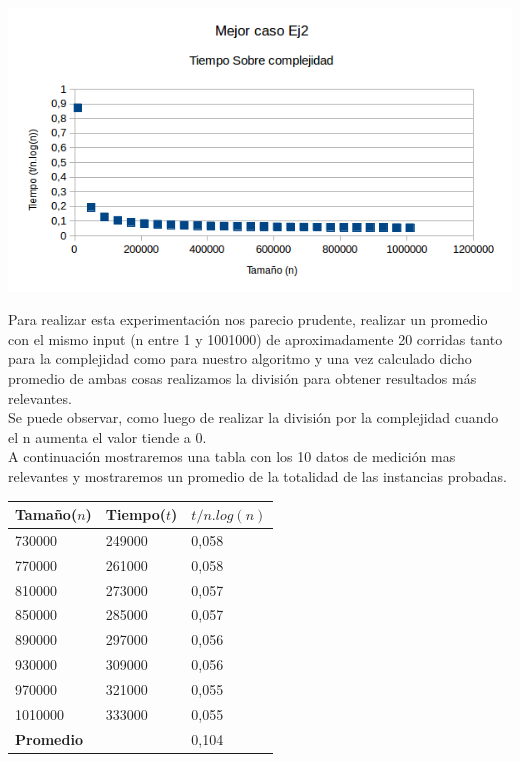 \vspace*{0.3cm} \vspace*{0.3cm}
  \begin{center}
 \includegraphics[scale=0.8]{./EJ2/grafico2ejmejorcaso1.png}
  \end{center}
  \vspace*{0.3cm}

Para realizar esta experimentaci\'on nos parecio prudente, realizar un promedio con el mismo input (n entre 1 y 1001000) de aproximadamente 20 corridas
tanto para la complejidad como para nuestro algoritmo y una vez calculado dicho promedio de ambas cosas realizamos la divisi\'on para
obtener resultados m\'as relevantes.\\ 

Se puede observar, como luego de realizar la divisi\'on por la complejidad cuando el n aumenta el valor tiende a 0.\\

A continuaci\'on mostraremos una tabla  con los 10 datos de medici\'on mas relevantes  y mostraremos un promedio de la totalidad de las instancias probadas.\\

\begin{table}[H]

    \begin{tabular}{ | l | l |l |}
    \hline
	Tamaño($n$) & Tiempo($t$) & \textbf{$t /n.log(n)$}  \\ \hline
730000 & 249000 & 0,058 \\ \hline
770000 & 261000 & 0,058 \\ \hline
810000 & 273000 & 0,057 \\ \hline
850000 & 285000 & 0,057 \\ \hline
890000 & 297000 & 0,056 \\ \hline
930000 & 309000 & 0,056 \\ \hline
970000 & 321000 & 0,055 \\ \hline
1010000 & 333000 & 0,055 \\ \hline
    \textbf{Promedio} & & 0,104  \\ \hline

    \end{tabular}
\end{table}

